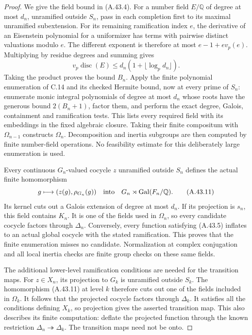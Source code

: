 \begin{proof}
We give the field bound in (A.43.4). For a number field
$E/\mathbb Q$ of degree at most $d_n$, unramified outside
$S_n$, pass in each completion first to its maximal
unramified subextension. For its remaining ramification
index $e$, the derivative of an Eisenstein polynomial for
a uniformizer has terms with pairwise distinct valuations
modulo $e$. The different exponent is therefore at most
$e-1+e v_p(e)$. Multiplying by residue degrees and summing
gives
\[
 v_p\operatorname{disc}(E)
           \le d_n(1+\lfloor\log_p d_n\rfloor).
 \tag{A.43.10}
\]
Taking the product proves the bound $B_n$. Apply the
finite polynomial enumeration of C.14 and its checked
Hermite bound, now at every prime of $S_n$: enumerate
monic integral polynomials of degree at most $d_n$ whose
roots have the generous bound $2(B_n+1)$, factor them,
and perform the exact degree, Galois, containment and
ramification tests. This lists every required field with
its embeddings in the fixed algebraic closure. Taking
their finite compositum with $\Omega_{n-1}$ constructs
$\Omega_n$. Decomposition and inertia subgroups are then
computed by finite number-field operations. No feasibility
estimate for this deliberately large enumeration is used.

Every continuous $G_n$-valued cocycle $z$ unramified
outside $S_n$ defines the actual finite homomorphism
\[
 g\longmapsto(z(g),\rho_{G_n}(g))
      \quad\hbox{into}\quad
      G_n\rtimes\operatorname{Gal}(F_n/\mathbb Q).
 \tag{A.43.11}
\]
Its kernel cuts out a Galois extension of degree at most
$d_n$. If its projection is $s_n$, this field contains
$K_n$. It is one of the fields used in $\Omega_n$, so
every candidate cocycle factors through $\Delta_n$.
Conversely, every function satisfying (A.43.5) inflates
to an actual global cocycle with the stated ramification.
This proves that the finite enumeration misses no candidate.
Normalization at complex conjugation and all local inertia
checks are finite group checks on these same fields.

The additional lower-level ramification conditions are
needed for the transition maps. For $z\in X_n$, its
projection to $G_k$ is unramified outside $S_k$. The
homomorphism (A.43.11) at level $k$ therefore cuts out
one of the fields included in $\Omega_k$. It follows
that the projected cocycle factors through $\Delta_k$.
It satisfies all the conditions defining $X_k$, so
projection gives the asserted transition map. This also
describes its finite computation: deflate the projected
function through the known restriction
$\Delta_n\twoheadrightarrow\Delta_k$. The transition
maps need not be onto.


\end{proof}
